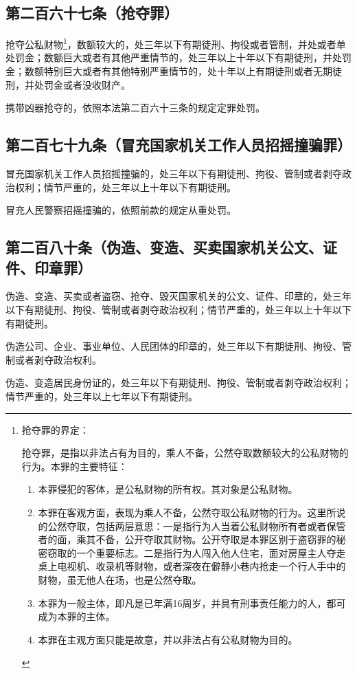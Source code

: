 \documentclass[utf-8,10pt]{ctexart}%
\begin{document}
\subsection{第二百六十七条（抢夺罪）}
抢夺公私财物\footnote{
抢夺罪的界定：

抢夺罪，是指以非法占有为目的，乘人不备，公然夺取数额较大的公私财物的行为。本罪的主要特征：
\begin{enumerate}
\item 本罪侵犯的客体，是公私财物的所有权。其对象是公私财物。
\item 本罪在客观方面，表现为乘人不备，公然夺取公私财物的行为。这里所说的公然夺取，包括两层意思：一是指行为人当着公私财物所有者或者保管者的面，乘其不备，公开夺取其财物。公开夺取是本罪区别于盗窃罪的秘密窃取的一个重要标志。二是指行为人闯入他人住宅，面对房屋主人夺走桌上电视机、收录机等财物，或者深夜在僻静小巷内抢走一个行人手中的财物，虽无他人在场，也是公然夺取。
\item 本罪为一般主体，即凡是已年满16周岁，并具有刑事责任能力的人，都可成为本罪的主体。
\item 本罪在主观方面只能是故意，并以非法占有公私财物为目的。
\end{enumerate}
}，数额较大的，处三年以下有期徒刑、拘役或者管制，并处或者单处罚金；数额巨大或者有其他严重情节的，处三年以上十年以下有期徒刑，并处罚金；数额特别巨大或者有其他特别严重情节的，处十年以上有期徒刑或者无期徒刑，并处罚金或者没收财产。

携带凶器抢夺的，依照本法第二百六十三条的规定定罪处罚。
\subsection{第二百七十九条（冒充国家机关工作人员招摇撞骗罪）}
冒充国家机关工作人员招摇撞骗的，处三年以下有期徒刑、拘役、管制或者剥夺政治权利；情节严重的，处三年以上十年以下有期徒刑。

冒充人民警察招摇撞骗的，依照前款的规定从重处罚。
\subsection{第二百八十条（伪造、变造、买卖国家机关公文、证件、印章罪）}
 
伪造、变造、买卖或者盗窃、抢夺、毁灭国家机关的公文、证件、印章的，处三年以下有期徒刑、拘役、管制或者剥夺政治权利；情节严重的，处三年以上十年以下有期徒刑。

伪造公司、企业、事业单位、人民团体的印章的，处三年以下有期徒刑、拘役、管制或者剥夺政治权利。

伪造、变造居民身份证的，处三年以下有期徒刑、拘役、管制或者剥夺政治权利；情节严重的，处三年以上七年以下有期徒刑。
\end{document}

